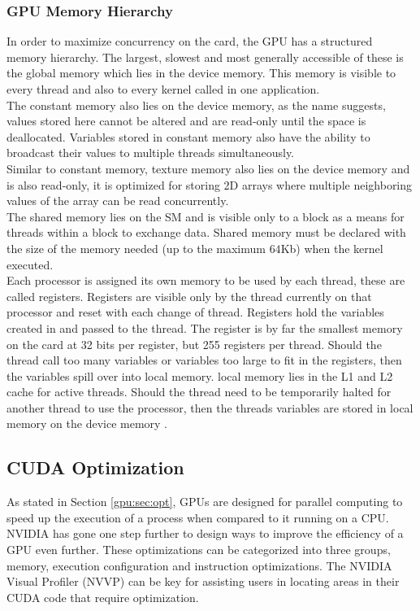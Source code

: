 \subsubsection{GPU Memory Hierarchy}\label{gpu:ssec:mem}
In order to maximize concurrency on the card, the GPU has a structured memory hierarchy. The largest, slowest and most generally accessible of these is the global memory which lies in the device memory. This memory is visible to every thread and also to every kernel called in one application. 
\\
The constant memory also lies on the device memory, as the name suggests, values stored here cannot be altered and are read-only until the space is deallocated. Variables stored in constant memory also have the ability to broadcast their values to multiple threads simultaneously.
\\
Similar to constant memory, texture memory also lies on the device memory and is also read-only, it is optimized for storing 2D arrays where multiple neighboring values of the array can be read concurrently.
\\
The shared memory lies on the SM and is visible only to a block as a means for threads within a block to exchange data. Shared memory must be declared with the size of the memory needed (up to the maximum $64$Kb) when the kernel executed.
\\
Each processor is assigned its own memory to be used by each thread, these are called registers. Registers are visible only by the thread currently on that processor and reset with each change of thread. Registers hold the variables created in and passed to the thread. The register is by far the smallest memory on the card at 32 bits per register, but 255 registers per thread. Should the thread call too many variables or variables too large to fit in the registers, then the variables spill over into local memory. local memory lies in the L1 and L2 cache for active threads. Should the thread need to be temporarily halted for another thread to use the processor, then the threads variables are stored in local memory on the device memory \citep{CUDA}.
%
\subsection{CUDA Optimization}\label{gpu:sec:cop}
As stated in Section \ref{gpu:sec:opt}, GPUs are designed for parallel computing to speed up the execution of a process when compared to it running on a CPU. NVIDIA has gone one step further to design ways to improve the efficiency of a GPU even further. These optimizations can be categorized into three groups, memory, execution configuration and instruction optimizations. The NVIDIA Visual Profiler (NVVP) can be key for assisting users in locating areas in their CUDA code that require optimization.
